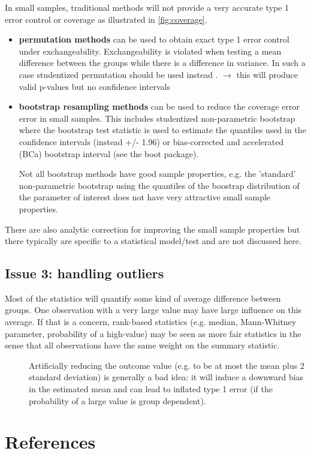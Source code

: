 \documentclass[12pt]{article}
\newcommand\Warning[1][3ex]{%
\renewcommand\stacktype{L}%
\scaleto{\stackon[1.3pt]{\color{red}$\triangle$}{\tiny\bfseries !}}{#1}%
\xspace
}
\begin{document}
In small samples, traditional methods will not provide a very accurate
type 1 error control or coverage as illustrated in
\autoref{fig:coverage}.
\begin{itemize}
\item \textbf{permutation methods} can be used to obtain exact type 1 error control
under exchangeability. Exchangeability is violated when
testing a mean difference between the groups while there is a
difference in variance. In such a case studentized permutation
should be used instead \citep{chung2016asymptotically}. \newline
\(\rightarrow\) this will produce valid p-values but no confidence
intervals
\item \textbf{bootstrap resampling methods} can be used to reduce the coverage
error error in small samples. This includes studentized
non-parametric bootstrap where the bootstrap test statistic is used
to estimate the quantiles used in the confidence intervals (instead
+/- 1.96) or bias-corrected and accelerated (BCa) bootstrap interval
(see the boot package). \newline \Warning Not all bootstrap methods
have good sample properties, e.g. the 'standard' non-parametric
bootstrap using the quantiles of the boostrap distribution of the
parameter of interest does not have very attractive small sample
properties.
\end{itemize}
There are also analytic correction for improving the small sample
properties but there typically are specific to a statistical
model/test and are not discussed here.

\subsection{Issue 3: handling outliers}
\label{sec:org7ca6472}

Most of the statistics will quantify some kind of average difference
between groups. One observation with a very large value may have large
influence on this average. If that is a concern, rank-based statistics
(e.g. median, Mann-Whitney parameter, probability of a high-value) may
be seen as more fair statistics in the sense that all observations
have the same weight on the summary statistic.
\begin{description}
\item[{\Warning}] Artificially reducing the outcome value (e.g. to be at
most the mean plus 2 standard deviation) is generally a bad idea: it
will induce a downward bias in the estimated mean and can lead to
inflated type 1 error (if the probability of a large value is group
dependent).
\end{description}

\clearpage



\section{References}
\label{sec:org42799f8}
\begingroup
\renewcommand{\section}[2]{}



\endgroup
\end{document}
